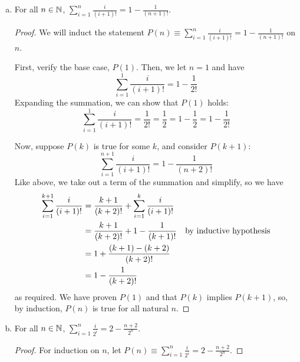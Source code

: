 \documentclass{agony}
\begin{document}
\begin{enumerate}[(a)]
\begin{proof}
          (Inductive Step) Now, suppose that $P(k)$ holds for an arbitrary $k$.
          Again, expand the summation but for the LHS of $P(k+1)$:
          \begin{align*}
            \sum^{k+1}_{i=0} r^i
             & = r^{k+1} + \sum^k_{i=0} r^i                  \\
             & = r^{k+1} + \frac{1-r^{k+1}}{1-r} \IH         \\
             & = \frac{(r^{k+1})(1-r) + 1 - r^{k+1}}{1-r}    \\
             & = \frac{r^{k+1} - r^{k+2} + 1 - r^{k+1}}{1-r} \\
             & = \frac{1 - r^{k+2}}{1-r}                     \\
          \end{align*}
          which is the other side of the equality.
          We have proved that if $P(n)$ holds, then $P(n+1)$ holds.
          Therefore, by induction, $P(n)$ holds for all natural $n$.
        \end{proof}
  \item For all $n\in\mathbb{N}$, $\displaystyle \sum^n_{i=1} \frac{i}{(i+1)!} = 1-\frac{1}{(n+1)!}$.
        \begin{proof}
          We will induct the statement $P(n) \equiv \sum^n_{i=1} \frac{i}{(i+1)!} = 1-\frac{1}{(n+1)!}$ on $n$.

          First, verify the base case, $P(1)$.
          Then, we let $n=1$ and have
          \[ \sum^1_{i=1} \frac{i}{(i+1)!} = 1-\frac{1}{2!} \]
          Expanding the summation, we can show that $P(1)$ holds:
          \[ \sum^1_{i=1} \frac{i}{(i+1)!} = \frac{1}{2!} = \frac{1}{2} = 1-\frac{1}{2} = 1-\frac{1}{2!} \]

          Now, suppose $P(k)$ is true for some $k$, and consider $P(k+1)$:
          \[ \sum^{n+1}_{i=1} \frac{i}{(i+1)!} = 1-\frac{1}{(n+2)!} \]
          Like above, we take out a term of the summation and simplify, so we have
          \begin{align*}
            \sum^{k+1}_{i=1} \frac{i}{(i+1)!}
             & = \frac{k+1}{(k+2)!} + \sum^{k}_{i=1} \frac{i}{(i+1)!} \\
             & = \frac{k+1}{(k+2)!} + 1 - \frac{1}{(k+1)!} & \text{by inductive hypothesis}        \\
             & = 1 + \frac{(k+1) - (k+2)}{(k+2)!}                     \\
             & = 1 - \frac{1}{(k+2)!}
          \end{align*}
          as required.
          We have proven $P(1)$ and that $P(k)$ implies $P(k+1)$, so, by induction, $P(n)$ is true for all natural $n$.
        \end{proof}
  \item For all $n\in\mathbb{N}$, $\displaystyle \sum^n_{i=1} \frac{i}{2^i} = 2-\frac{n+2}{2^n}$.
        \begin{proof}
          For induction on $n$, let $P(n) \equiv \sum^n_{i=1} \frac{i}{2^i} = 2-\frac{n+2}{2^n}$.


\end{proof}
\end{enumerate}
\end{document}
